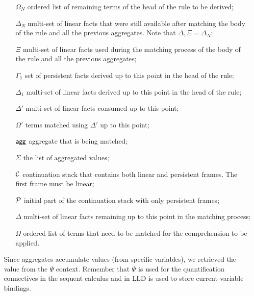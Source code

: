 \begin{enumerate}
   \item[$\Omega_N$] ordered list of remaining terms of the head of the rule to
   be derived;

   \item[$\Delta_N$] multi-set of linear facts that were still available after
   matching the body of the rule and all the previous aggregates. Note that
   $\Delta, \Xi = \Delta_N$;

   \item[$\Xi$] multi-set of linear facts used during the matching process of
   the body of the rule and all the previous aggregates;

   \item[$\Gamma_{1}$] set of persistent facts derived up to this point in the
   head of the rule;

   \item[$\Delta_{1}$] multi-set of linear facts derived up to this point in
   the head of the rule;

   \item[$\Delta'$] multi-set of linear facts consumed up to this point;

   \item[$\Omega'$] terms matched using $\Delta'$ up to this point;

   \item[$\mathsf{agg}$] aggregate that is being matched;

   \item[$\Sigma$] the list of aggregated values;

   \item[$\mathcal{C}$] continuation stack that contains both linear and persistent
   frames. The first frame must be linear;

   \item[$\mathcal{P}$] initial part of the continuation stack with only persistent
   frames;

   \item[$\Delta$] multi-set of linear facts remaining up to this point in the
   matching process;

   \item[$\Omega$] ordered list of terms that need to be matched for the
   comprehension to be applied.

\end{enumerate}

Since aggregates accumulate values (from specific variables), we retrieved the
value from the $\Psi$ context. Remember that $\Psi$ is used for the
quantification connectives in the sequent calculus and in LLD is used to store
current variable bindings.

